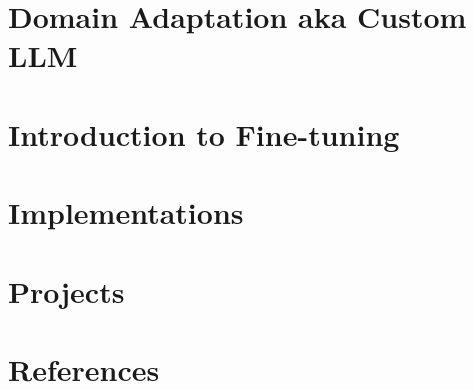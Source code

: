 \section[DA]{Domain Adaptation aka Custom LLM}


\section[Intro]{Introduction to Fine-tuning}


\section[Impl]{Implementations}




\section[Proj]{Projects}




\section[Refs]{References}
